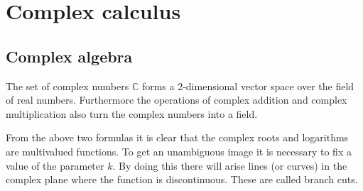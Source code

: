 \chapter{Complex calculus}
\section{Complex algebra}
	The set of complex numbers $\mathbb{C}$ forms a 2-dimensional vector space over the field of real numbers. Furthermore the operations of complex addition and complex multiplication also turn the complex numbers into a field.

    
    
    
    \begin{definition}
    	From the above two formulas it is clear that the complex roots and logarithms are multivalued functions. To get an unambiguous image it is necessary to fix a value of the parameter $k$. By doing this there will arise lines (or curves) in the complex plane where the function is discontinuous. These are called branch cuts.
	\end{definition}

